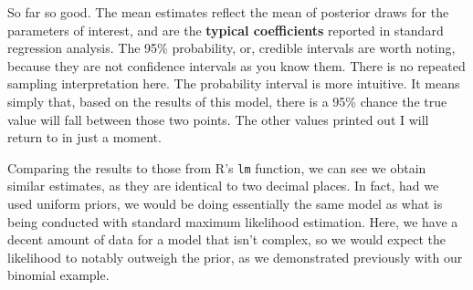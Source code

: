 \documentclass[]{book}
\newenvironment{Shaded}{\begin{snugshade}}{\end{snugshade}}
\newcommand{\CommentTok}[1]{\textcolor[rgb]{0.56,0.35,0.01}{\textit{#1}}}
\newcommand{\DataTypeTok}[1]{\textcolor[rgb]{0.13,0.29,0.53}{#1}}
\newcommand{\DecValTok}[1]{\textcolor[rgb]{0.00,0.00,0.81}{#1}}
\newcommand{\KeywordTok}[1]{\textcolor[rgb]{0.13,0.29,0.53}{\textbf{#1}}}
\newcommand{\NormalTok}[1]{#1}
\newcommand{\StringTok}[1]{\textcolor[rgb]{0.31,0.60,0.02}{#1}}
\begin{document}
\begin{Shaded}
\end{Shaded}

So far so good. The mean estimates reflect the mean of posterior draws for the parameters of interest, and are the \textbf{typical coefficients} reported in standard regression analysis. The 95\% probability, or, credible intervals are worth noting, because they are not confidence intervals as you know them. There is no repeated sampling interpretation here. The probability interval is more intuitive. It means simply that, based on the results of this model, there is a 95\% chance the true value will fall between those two points. The other values printed out I will return to in just a moment.

Comparing the results to those from R's \texttt{lm} function, we can see we obtain similar estimates, as they are identical to two decimal places. In fact, had we used uniform priors, we would be doing essentially the same model as what is being conducted with standard maximum likelihood estimation. Here, we have a decent amount of data for a model that isn't complex, so we would expect the likelihood to notably outweigh the prior, as we demonstrated previously with our binomial example.
\end{document}
